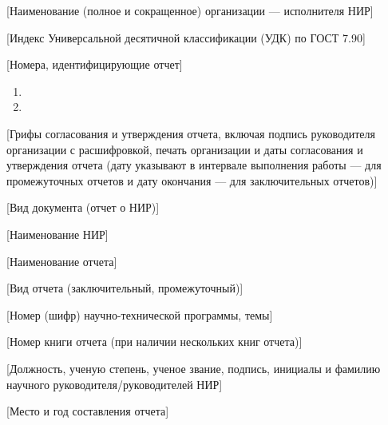 \documentclass[xelatex,big]{G7-32-2017}
\begin{document}
\begin{titlepage}

    [Наименование (полное и сокращенное) организации --- исполнителя НИР]

    [Индекс Универсальной десятичной классификации (УДК) по ГОСТ 7.90]

    [Номера, идентифицирующие отчет]
    \begin{enumerate}
        \item {}
        \item {}
    \end{enumerate}
    
    [Грифы согласования и утверждения отчета, включая подпись руководителя организации с расшифровкой, печать организации и даты согласования и утверждения отчета (дату указывают в интервале выполнения работы --- для промежуточных отчетов и дату окончания --- для заключительных отчетов)]

    [Вид документа (отчет о НИР)]
    
    [Наименование НИР]
    
    [Наименование отчета]
    
    [Вид отчета (заключительный, промежуточный)]
    
    [Номер (шифр) научно-технической программы, темы]
    
    [Номер книги отчета (при наличии нескольких книг отчета)]
    
    [Должность, ученую степень, ученое звание, подпись, инициалы и фамилию научного руководителя/руководителей НИР]
    
    [Место и год составления отчета]


                


\end{titlepage}
\end{document}
